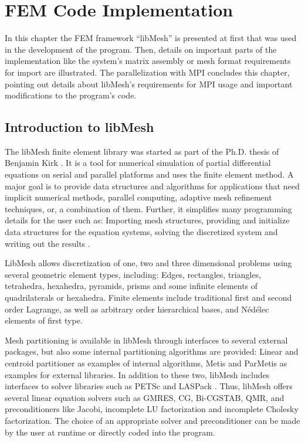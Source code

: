 \section{FEM Code Implementation}
 In this chapter the FEM framework ``libMesh'' is presented at first that was used in the development of the program. Then, details on important parts of the implementation like the system's matrix assembly or mesh format requirements for import are illustrated. The parallelization with MPI concludes this chapter, pointing out details about libMesh's requirements for MPI usage and important modifications to the program's code.
 
 
 
 \subsection{Introduction to libMesh}\label{sec:Impl-Intro}
 The libMesh finite element library was started as part of the Ph.D. thesis of Benjamin Kirk \cite{kirk2007adaptive}. It is a tool for numerical simulation of partial differential equations on serial and parallel platforms and uses the finite element method. A major goal is to provide data structures and algorithms for applications that need implicit numerical methods, parallel computing, adaptive mesh refinement techniques, or, a combination of them. Further, it simplifies many programming details for the user such as: Importing mesh structures, providing and initialize data structures for the equation systems, solving the discretized system and writing out the results \cite{kirk2013case}.
 
 LibMesh allows discretization of one, two and three dimensional problems using several geometric element types, including: Edges, rectangles, triangles, tetrahedra, hexahedra, pyramids, prisms and some infinite elements of quadrilaterals or hexahedra. Finite elements include traditional first and second order Lagrange, as well as arbitrary order hierarchical bases, and N\'{e}d\'{e}lec elements of first type.
 
 Mesh partitioning is available in libMesh through interfaces to several external packages, but also some internal partitioning algorithms are provided: Linear and centroid partitioner as examples of internal algorithms, Metis and ParMetis \cite{karypis1998fast} as examples for external libraries. In addition to these two, libMesh includes interfaces to solver libraries such as PETSc \cite{petsc-web-page} and LASPack \cite{laspack2015url}. Thus, libMesh offers several linear equation solvers such as GMRES, CG, Bi-CGSTAB, QMR, and preconditioners like Jacobi, incomplete LU factorization and incomplete Cholesky factorization. The choice of an appropriate solver and preconditioner can be made by the user at runtime or directly coded into the program.
 
